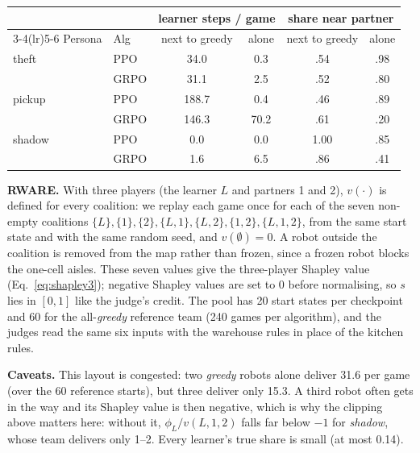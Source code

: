 \documentclass[letterpaper]{article} %
\begin{document}
\noindent\begin{minipage}{\textwidth}
\centering
\footnotesize
\setlength{\tabcolsep}{3.5pt}
\begin{tabular}{@{}llcccc@{}}
\toprule
 & & \multicolumn{2}{c}{learner steps / game} & \multicolumn{2}{c}{share near partner} \\
\cmidrule(lr){3-4}\cmidrule(lr){5-6}
Persona & Alg & next to greedy & alone & next to greedy & alone \\
\midrule
theft & PPO & 34.0 & 0.3 & .54 & .98 \\
 & GRPO & 31.1 & 2.5 & .52 & .80 \\
pickup & PPO & 188.7 & 0.4 & .46 & .89 \\
 & GRPO & 146.3 & 70.2 & .61 & .20 \\
shadow & PPO & 0.0 & 0.0 & 1.00 & .85 \\
 & GRPO & 1.6 & 6.5 & .86 & .41 \\
\bottomrule
\end{tabular}
\label{tab:solo}
\end{minipage}\par\medskip

\textbf{RWARE.}
\label{app:rware}
With three players (the learner $L$ and partners 1 and 2), $v(\cdot)$ is defined for every coalition:
we replay each game once for each of the seven non-empty coalitions $\{L\},\{1\},\{2\},\{L,1\},\{L,2\},\{1,2\},\{L,1,2\}$,
from the same start state and with the same random seed, and $v(\emptyset)=0$. A robot outside the coalition is removed
from the map rather than frozen, since a frozen robot blocks the one-cell aisles. These seven values give the
three-player Shapley value (Eq.~\eqref{eq:shapley3}); negative Shapley values are set to 0 before normalising, so $s$
lies in $[0,1]$ like the judge's credit. The pool has 20 start states per checkpoint and 60 for the all-\emph{greedy} reference team (240 games per algorithm), and the
judges read the same six inputs with the warehouse rules in place of the kitchen rules.

\textbf{Caveats.} This layout is congested: two \emph{greedy} robots alone deliver 31.6 per game (over the 60 reference starts), but three deliver only
15.3. A third robot often gets in the way and its Shapley value is then negative, which is why the clipping above
matters here: without it, $\phi_L/v(L,1,2)$ falls far below $-1$ for \emph{shadow}, whose team delivers only 1--2. Every
learner's true share is small (at most 0.14).
\end{document}
